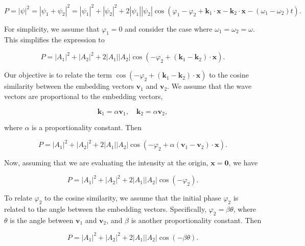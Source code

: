 \documentclass[prd,amsmath,amssymb,12pt]{revtex4}
\begin{document}
\begin{equation}
    P = |\psi|^2 = |\psi_1 + \psi_2|^2 = |\psi_1|^2 + |\psi_2|^2 + 2 |\psi_1| |\psi_2| \cos(\varphi_1 - \varphi_2
     + \mathbf{k}_1 \cdot \mathbf{x}
    - \mathbf{k}_2 \cdot \mathbf{x} - (\omega_1 - \omega_2)t).
\end{equation}

\noindent
For simplicity, we assume that $\varphi_1 = 0$  and
consider the case where $\omega_1 = \omega_2 = \omega$. This simplifies the expression to

\begin{equation}
    P = |A_1|^2 + |A_2|^2 + 2 |A_1| |A_2| \cos(-\varphi_2 + (\mathbf{k}_1 - \mathbf{k}_2) \cdot \mathbf{x}).
\end{equation}

\noindent
Our objective is to relate the term $\cos(-\varphi_2 + (\mathbf{k}_1 - \mathbf{k}_2) \cdot \mathbf{x})$ to
the cosine similarity between the embedding vectors $\mathbf{v}_1$ and $\mathbf{v}_2$.
We assume that the wave vectors are proportional to the embedding vectors,

\begin{equation}
    \mathbf{k}_1 = \alpha \mathbf{v}_1, \quad \mathbf{k}_2 = \alpha \mathbf{v}_2,
\end{equation}

\noindent
where $\alpha$ is a proportionality constant.
Then

\begin{equation}
    P = |A_1|^2 + |A_2|^2 + 2 |A_1| |A_2| \cos(-\varphi_2 + \alpha (\mathbf{v}_1 - \mathbf{v}_2) \cdot \mathbf{x}).
\end{equation}

\noindent
Now, assuming that we are evaluating the intensity at the origin, $\mathbf{x} = \mathbf{0}$, we have

\begin{equation}
    P = |A_1|^2 + |A_2|^2 + 2 |A_1| |A_2| \cos(-\varphi_2).
\end{equation}

\noindent
To relate $\varphi_2$ to the cosine similarity, we assume that the initial phase $\varphi_2$ is related to the
angle between the embedding vectors. Specifically, $\varphi_2 = \beta \theta$,
where $\theta$ is the angle between $\mathbf{v}_1$ and $\mathbf{v}_2$, and $\beta$ is another
proportionality constant. Then

\begin{equation}
    P = |A_1|^2 + |A_2|^2 + 2 |A_1| |A_2| \cos(-\beta \theta).
\end{equation}
\end{document}

